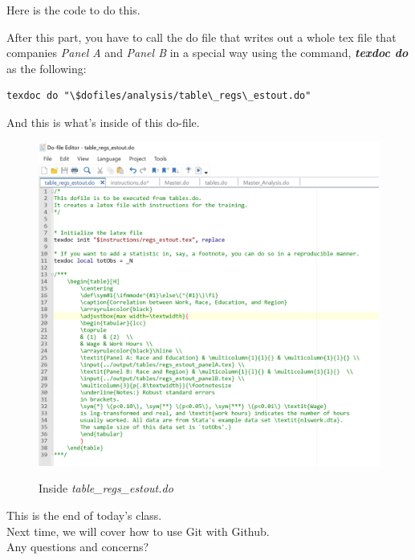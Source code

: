 \documentclass[14pt]{article}
\begin{document}
Here is the code to do this. \\

\begin{stlog}\end{stlog}

After this part, you have to call the do file that writes out a whole tex file that companies \textit{Panel A} and \textit{Panel B} in a special way using the command, \textbf{\textit{texdoc do}} as the following: \\

\begin{verbatim}
texdoc do "\$dofiles/analysis/table\_regs\_estout.do"
\end{verbatim}


And this is what's inside of this do-file. \\


\begin{figure}[H]
	\centering
	\caption{Inside \textit{table\_regs\_estout.do}}
	\includegraphics[width=\linewidth]{example_texdoc}
	\label{fig:exampletexdoc}
\end{figure}


This is the end of today's class. \\


Next time, we will cover how to use Git with Github. \\


Any questions and concerns?
\end{document}
